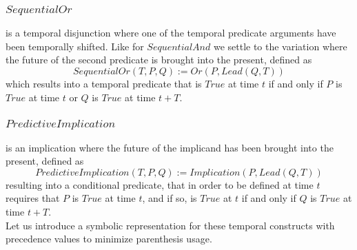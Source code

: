 \documentclass[runningheads]{llncs}
\newcommand{\TTrue}{\textit{True}}
\newcommand{\TOr}{\textit{Or}}
\newcommand{\TImpl}{\textit{Implication}}
\newcommand{\TPredImpl}{\textit{PredictiveImplication}}
\newcommand{\TSeqAnd}{\textit{SequentialAnd}}
\newcommand{\TSeqOr}{\textit{SequentialOr}}
\newcommand{\TLead}{\textit{Lead}}
\begin{document}
\subsubsection{$\TSeqOr$} is a temporal disjunction where one of the
temporal predicate arguments have been temporally shifted.  Like for
$\TSeqAnd$ we settle to the variation where the future of the second
predicate is brought into the present, defined as
$$\TSeqOr(T, P, Q) := \TOr(P, \TLead(Q, T))$$
which results into a temporal predicate that is $\TTrue$ at time $t$
if and only if $P$ is $\TTrue$ at time $t$ or $Q$ is $\TTrue$ at time
$t+T$.

\subsubsection{$\TPredImpl$} is an implication where the future of the
implicand has been brought into the present, defined as
$$\TPredImpl(T, P, Q) := \TImpl(P, \TLead(Q, T))$$
resulting into a conditional predicate, that in order to be defined at
time $t$ requires that $P$ is $\TTrue$ at time $t$, and if so, is
$\TTrue$ at $t$ if and only if $Q$ is $\TTrue$ at time $t+T$.\\

Let us introduce a symbolic representation for these temporal
constructs with precedence values to minimize parenthesis usage.

\end{document}
